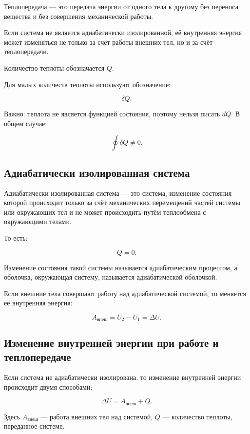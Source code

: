 \documentclass[a4paper,12pt]{article}
\begin{document}
\begin{definitionbox}
Теплопередача — это передача энергии от одного тела к другому без переноса вещества и без совершения механической работы.
\end{definitionbox}

Если система не является адиабатически изолированной, её внутренняя энергия может изменяться не только за счёт работы внешних тел, но и за счёт теплопередачи.

Количество теплоты обозначается $Q$.

Для малых количеств теплоты используют обозначение:

\[
\delta Q.
\]

Важно: теплота не является функцией состояния, поэтому нельзя писать $dQ$. В общем случае:

\[
\oint \delta Q \neq 0.
\]

\subsection*{Адиабатически изолированная система}

\begin{definitionbox}
Адиабатически изолированная система — это система, изменение состояния которой происходит только за счёт механических перемещений частей системы или окружающих тел и не может происходить путём теплообмена с окружающими телами.
\end{definitionbox}

То есть:

\[
Q=0.
\]

Изменение состояния такой системы называется адиабатическим процессом, а оболочка, окружающая систему, называется адиабатической оболочкой.

Если внешние тела совершают работу над адиабатической системой, то меняется её внутренняя энергия:

\[
A_{\text{внеш}}=U_2-U_1=\Delta U.
\]

\subsection*{Изменение внутренней энергии при работе и теплопередаче}

Если система не адиабатически изолирована, то изменение внутренней энергии происходит двумя способами:

\[
\Delta U=A_{\text{внеш}}+Q.
\]

Здесь $A_{\text{внеш}}$ — работа внешних тел над системой, $Q$ — количество теплоты, переданное системе.
\end{document}
